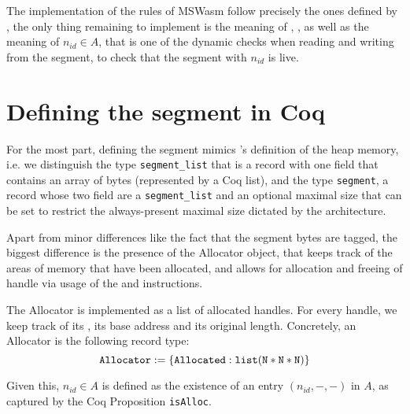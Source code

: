 \documentclass[a4paper]{article}
\begin{document}
The implementation of the rules of MSWasm follow precisely the ones defined by \citet{mswasm}, the only thing remaining to implement is the meaning of , , as well as the meaning of \( n_{id}\in A \), that is one of the dynamic checks when reading and writing from the segment, to check that the segment with \xxWid \( n_{id} \) is live.

\section{Defining the segment in Coq}

For the most part, defining the segment mimics \iriswasm's definition of the heap memory, i.e. we distinguish the type {\tt segment\_list} that is a record with one field that contains an array of bytes (represented by a Coq list), and the type {\tt segment}, a record whose two field are a {\tt segment\_list} and an optional maximal size that can be set to restrict the always-present maximal size dictated by the architecture.

Apart from minor differences like the fact that the segment bytes are tagged, the biggest difference is the presence of the Allocator object, that keeps track of the areas of memory that have been allocated, and allows for allocation and freeing of handle via usage of the \xxWsegalloc and \xxWsegfree instructions.

The Allocator is implemented as a list of allocated handles. For every handle, we keep track of its \xxWid, its base address and its original length. Concretely, an Allocator is the following record type:
\[ \tt Allocator := \{ Allocated : list (N * N * N) \} \]

Given this, \( n_{id}\in A \) is defined as the existence of an entry \( (n_{id}, -, -) \) in \( A \), as captured by the Coq Proposition {\tt isAlloc}.
\end{document}

